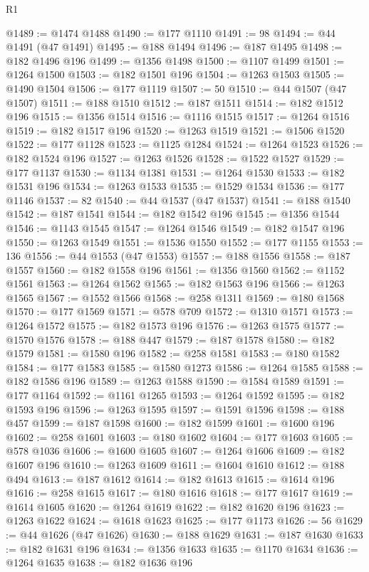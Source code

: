 \begin{lexlean}{R1}
\begin{coremodule}
@1489 := @1474 @1488
@1490 := @177 @1110
@1491 := 98
@1494 := @44 @1491 (@47 @1491)
@1495 := @188 @1494
@1496 := @187 @1495
@1498 := @182 @1496 @196
@1499 := @1356 @1498
@1500 := @1107 @1499
@1501 := @1264 @1500
@1503 := @182 @1501 @196
@1504 := @1263 @1503
@1505 := @1490 @1504
@1506 := @177 @1119
@1507 := 50
@1510 := @44 @1507 (@47 @1507)
@1511 := @188 @1510
@1512 := @187 @1511
@1514 := @182 @1512 @196
@1515 := @1356 @1514
@1516 := @1116 @1515
@1517 := @1264 @1516
@1519 := @182 @1517 @196
@1520 := @1263 @1519
@1521 := @1506 @1520
@1522 := @177 @1128
@1523 := @1125 @1284
@1524 := @1264 @1523
@1526 := @182 @1524 @196
@1527 := @1263 @1526
@1528 := @1522 @1527
@1529 := @177 @1137
@1530 := @1134 @1381
@1531 := @1264 @1530
@1533 := @182 @1531 @196
@1534 := @1263 @1533
@1535 := @1529 @1534
@1536 := @177 @1146
@1537 := 82
@1540 := @44 @1537 (@47 @1537)
@1541 := @188 @1540
@1542 := @187 @1541
@1544 := @182 @1542 @196
@1545 := @1356 @1544
@1546 := @1143 @1545
@1547 := @1264 @1546
@1549 := @182 @1547 @196
@1550 := @1263 @1549
@1551 := @1536 @1550
@1552 := @177 @1155
@1553 := 136
@1556 := @44 @1553 (@47 @1553)
@1557 := @188 @1556
@1558 := @187 @1557
@1560 := @182 @1558 @196
@1561 := @1356 @1560
@1562 := @1152 @1561
@1563 := @1264 @1562
@1565 := @182 @1563 @196
@1566 := @1263 @1565
@1567 := @1552 @1566
@1568 := @258 @1311
@1569 := @180 @1568
@1570 := @177 @1569
@1571 := @578 @709
@1572 := @1310 @1571
@1573 := @1264 @1572
@1575 := @182 @1573 @196
@1576 := @1263 @1575
@1577 := @1570 @1576
@1578 := @188 @447
@1579 := @187 @1578
@1580 := @182 @1579
@1581 := @1580 @196
@1582 := @258 @1581
@1583 := @180 @1582
@1584 := @177 @1583
@1585 := @1580 @1273
@1586 := @1264 @1585
@1588 := @182 @1586 @196
@1589 := @1263 @1588
@1590 := @1584 @1589
@1591 := @177 @1164
@1592 := @1161 @1265
@1593 := @1264 @1592
@1595 := @182 @1593 @196
@1596 := @1263 @1595
@1597 := @1591 @1596
@1598 := @188 @457
@1599 := @187 @1598
@1600 := @182 @1599
@1601 := @1600 @196
@1602 := @258 @1601
@1603 := @180 @1602
@1604 := @177 @1603
@1605 := @578 @1036
@1606 := @1600 @1605
@1607 := @1264 @1606
@1609 := @182 @1607 @196
@1610 := @1263 @1609
@1611 := @1604 @1610
@1612 := @188 @494
@1613 := @187 @1612
@1614 := @182 @1613
@1615 := @1614 @196
@1616 := @258 @1615
@1617 := @180 @1616
@1618 := @177 @1617
@1619 := @1614 @1605
@1620 := @1264 @1619
@1622 := @182 @1620 @196
@1623 := @1263 @1622
@1624 := @1618 @1623
@1625 := @177 @1173
@1626 := 56
@1629 := @44 @1626 (@47 @1626)
@1630 := @188 @1629
@1631 := @187 @1630
@1633 := @182 @1631 @196
@1634 := @1356 @1633
@1635 := @1170 @1634
@1636 := @1264 @1635
@1638 := @182 @1636 @196

\end{coremodule}
\end{lexlean}
